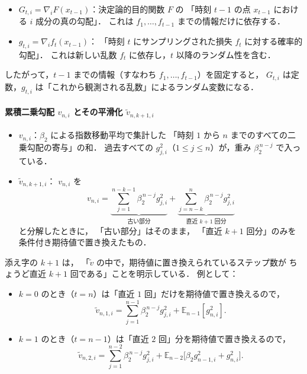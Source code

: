 \documentclass[dvipdfmx,a4paper,11pt]{jsarticle}
\begin{document}
\begin{itemize}
  \item $G_{t,i} = \nabla_i F(x_{t-1})$：決定論的目的関数 $F$ の
    「時刻 $t-1$ の点 $x_{t-1}$ における $i$ 成分の真の勾配」．
    これは $f_1,\ldots,f_{t-1}$ までの情報だけに依存する．
  \item $g_{t,i} = \nabla_i f_t(x_{t-1})$：
    「時刻 $t$ にサンプリングされた損失 $f_t$ に対する確率的勾配」．
    これは新しい乱数 $f_t$ に依存し，$t$ 以降のランダム性を含む．
\end{itemize}

したがって，$t-1$ までの情報（すなわち $f_1,\ldots,f_{t-1}$）を固定すると，
$G_{t,i}$ は定数，$g_{t,i}$ は「これから観測される乱数」によるランダム変数になる．

\paragraph{累積二乗勾配 $v_{n,i}$ とその平滑化 $\tilde{v}_{n,k+1,i}$}

\begin{itemize}
  \item $v_{n,i}$：$\beta_2$ による指数移動平均で集計した
    「時刻 $1$ から $n$ までのすべての二乗勾配の寄与」の和．
    過去すべての $g_{j,i}^2$（$1 \le j \le n$）が，重み $\beta_2^{\,n-j}$ で入っている．
  \item $\tilde{v}_{n,k+1,i}$：
    $v_{n,i}$ を
    \[
      v_{n,i}
      =
      \underbrace{\sum_{j=1}^{n-k-1} \beta_2^{\,n-j} g_{j,i}^2}_{\text{古い部分}}
      +
      \underbrace{\sum_{j=n-k}^{n} \beta_2^{\,n-j} g_{j,i}^2}_{\text{直近 $k+1$ 回分}}
    \]
    と分解したときに，
    「古い部分」はそのまま，
    「直近 $k+1$ 回分」のみを条件付き期待値で置き換えたもの．
\end{itemize}

添え字の $k+1$ は，
「$\tilde{v}$ の中で，期待値に置き換えられているステップ数が
  ちょうど直近 $k+1$ 回である」ことを明示している．
例として：

\begin{itemize}
  \item $k=0$ のとき（$t=n$）は「直近 $1$ 回」だけを期待値で置き換えるので，
    \[
      \tilde{v}_{n,1,i}
      = \sum_{j=1}^{n-1} \beta_2^{\,n-j} g_{j,i}^2
        + \mathbb{E}_{n-1}[g_{n,i}^2] .
    \]
  \item $k=1$ のとき（$t=n-1$）は「直近 $2$ 回」分を期待値で置き換えるので，
    \[
      \tilde{v}_{n,2,i}
      = \sum_{j=1}^{n-2} \beta_2^{\,n-j} g_{j,i}^2
        + \mathbb{E}_{n-2}\!\bigl[\beta_2 g_{n-1,i}^2 + g_{n,i}^2\bigr] .
    \]
\end{itemize}
\end{document}
